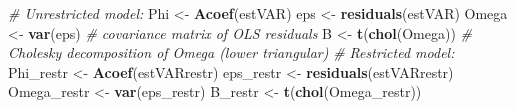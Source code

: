 \documentclass[
  11pt,
]{book}
\newenvironment{Shaded}{\begin{snugshade}}{\end{snugshade}}
\newcommand{\CommentTok}[1]{\textcolor[rgb]{0.56,0.35,0.01}{\textit{#1}}}
\newcommand{\FunctionTok}[1]{\textcolor[rgb]{0.13,0.29,0.53}{\textbf{#1}}}
\newcommand{\NormalTok}[1]{#1}
\newcommand{\OtherTok}[1]{\textcolor[rgb]{0.56,0.35,0.01}{#1}}
\theoremstyle{definition}
\theoremstyle{definition}
\theoremstyle{definition}
\theoremstyle{definition}
\theoremstyle{remark}
\begin{document}
\begin{Shaded}
\begin{Highlighting}[]
\CommentTok{\# Unrestricted model:}
\NormalTok{Phi }\OtherTok{\textless{}{-}} \FunctionTok{Acoef}\NormalTok{(estVAR)}
\NormalTok{eps }\OtherTok{\textless{}{-}} \FunctionTok{residuals}\NormalTok{(estVAR)}
\NormalTok{Omega }\OtherTok{\textless{}{-}} \FunctionTok{var}\NormalTok{(eps) }\CommentTok{\# covariance matrix of OLS residuals}
\NormalTok{B }\OtherTok{\textless{}{-}} \FunctionTok{t}\NormalTok{(}\FunctionTok{chol}\NormalTok{(Omega)) }\CommentTok{\# Cholesky decomposition of Omega (lower triangular)}
\CommentTok{\# Restricted model:}
\NormalTok{Phi\_restr }\OtherTok{\textless{}{-}} \FunctionTok{Acoef}\NormalTok{(estVARrestr)}
\NormalTok{eps\_restr }\OtherTok{\textless{}{-}} \FunctionTok{residuals}\NormalTok{(estVARrestr)}
\NormalTok{Omega\_restr }\OtherTok{\textless{}{-}} \FunctionTok{var}\NormalTok{(eps\_restr)}
\NormalTok{B\_restr }\OtherTok{\textless{}{-}} \FunctionTok{t}\NormalTok{(}\FunctionTok{chol}\NormalTok{(Omega\_restr))}


\end{Highlighting}
\end{Shaded}
\end{document}
